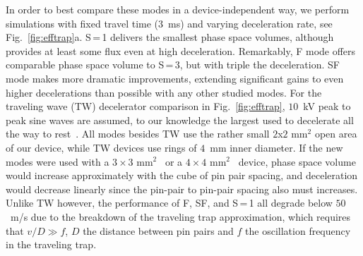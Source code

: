 \documentclass[%
 reprint,
 amsmath,amssymb,
 aps,
prl,
]{revtex4-1}
\begin{document}
In order to best compare these modes in a device-independent way, we perform simulations with fixed travel time ($3$~ms) and varying deceleration rate, see Fig.~\ref{fig:efftrap}a.
S\,=\,1 delivers the smallest phase space volumes, although provides at least some flux even at high deceleration.
Remarkably, F mode offers comparable phase space volume to S\,=\,3, but with triple the deceleration.
SF mode makes more dramatic improvements, extending significant gains to even higher decelerations than possible with any other studied modes.
For the traveling wave (TW) decelerator comparison in Fig.~\ref{fig:efftrap}, $10$~kV peak to peak sine waves are assumed, to our knowledge the largest used to decelerate all the way to rest~\cite{Quintero-Perez2013}.
All modes besides TW use the rather small $2$x$2\text{ mm}^2$ open area of our device, while TW devices use rings of $4$~mm inner diameter.
If the new modes were used with a $3\times3\text{ mm}^2$~\cite{Scharfenberg2009} or a $4\times4\text{ mm}^2$~\cite{VandeMeerakker2005} device, phase space volume would increase approximately with the cube of pin pair spacing, and deceleration would decrease linearly since the pin-pair to pin-pair spacing also must increases.
Unlike TW however, the performance of F, SF, and S\,=\,1 all degrade below $50$~m/s due to the breakdown of the traveling trap approximation, which requires that $v/D \gg f$, $D$ the distance between pin pairs and $f$ the oscillation frequency in the traveling trap.
\end{document}
